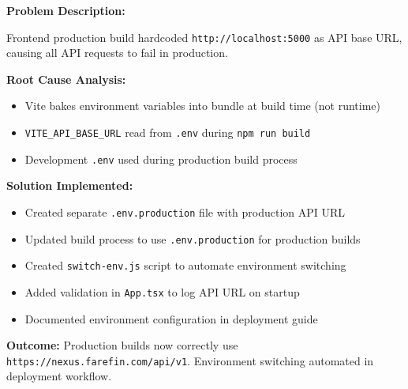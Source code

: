 \documentclass[12pt,a4paper]{article}
\begin{document}
\begin{tcolorbox}[colback=LightTeal, colframe=Teal, title=\textbf{Challenge 4: Production Build Environment Variables}, fonttitle=\bfseries]

\textbf{Problem Description:}

Frontend production build hardcoded \texttt{http://localhost:5000} as API base URL, causing all API requests to fail in production.

\textbf{Root Cause Analysis:}
\begin{itemize}[noitemsep]
  \item Vite bakes environment variables into bundle at build time (not runtime)
  \item \texttt{VITE\_API\_BASE\_URL} read from \texttt{.env} during \texttt{npm run build}
  \item Development \texttt{.env} used during production build process
\end{itemize}

\textbf{Solution Implemented:}
\begin{itemize}[noitemsep]
  \item Created separate \texttt{.env.production} file with production API URL
  \item Updated build process to use \texttt{.env.production} for production builds
  \item Created \texttt{switch-env.js} script to automate environment switching
  \item Added validation in \texttt{App.tsx} to log API URL on startup
  \item Documented environment configuration in deployment guide
\end{itemize}

\textbf{Outcome:} Production builds now correctly use \texttt{https://nexus.farefin.com/api/v1}. Environment switching automated in deployment workflow.
\end{tcolorbox}

\vspace{8pt}
\end{document}
